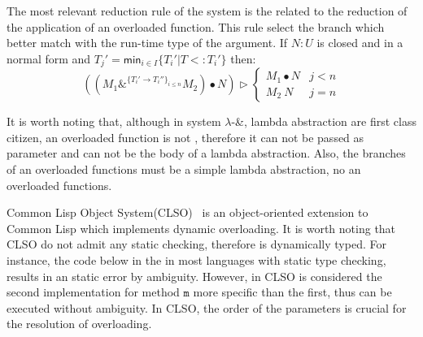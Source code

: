 \documentclass[hidelinks, twocolumn]{article}
\begin{document}
The most relevant reduction rule of the system is the related to the reduction of the application of an overloaded function. This rule select the branch which better match with the run-time type of the argument.
If $N:U$ is closed and in a normal form and $T_j' = \mathsf{min}_{i \in I} \{ T_i'| T <: T_i'\}$ then:
\[((M_1\&^{\{ T_i' \to T_i''\}_{i \leq n}}M_2) \bullet N) \rhd \begin{cases}
M_1 \bullet N &  j < n \\
M_2 \ N &  j = n
\end{cases}\]

It is worth noting that, although in system $\lambda$-\&, lambda abstraction are first class citizen, an overloaded function is not , therefore it can not be passed as parameter and can not be the body of a lambda abstraction. Also, the branches of an overloaded functions must be a simple lambda abstraction, no an overloaded functions.





\medskip 



Common Lisp Object System(CLSO)~\cite{Bobrow:1988:CLO:885631.885632} is an object-oriented extension to Common Lisp which implements dynamic overloading. It is worth noting that CLSO do not admit any static checking, therefore is dynamically typed. For instance, the code below in the in most languages with static type checking, results in an static error by ambiguity. However, in CLSO is considered the second implementation for  method $\texttt{m}$ more specific than the first, thus can be executed without ambiguity. In CLSO, the order of the parameters is crucial for the resolution of overloading.\\


\end{document}

